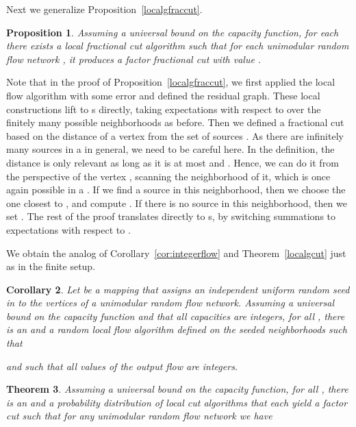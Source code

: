 \documentclass[12pt,a4paper]{article}
\newtheorem{Theorem}{Theorem}
\newtheorem{Corollary}[Theorem]{Corollary}
\newtheorem{Proposition}[Theorem]{Proposition}
\renewcommand{\:}{\colon}
\begin{document}
Next we generalize Proposition~\ref{localgfraccut}. 

\begin{Proposition}\label{localgfraccutuni}
Assuming a universal bound  on the capacity function, for each  there exists a local fractional cut algorithm such that for each unimodular random flow network , it produces a factor fractional cut with value .
\end{Proposition}

Note that in the proof of Proposition~\ref{localgfraccut}, we first applied the local flow algorithm with some error  and defined the residual graph. 
These local constructions lift to s directly, taking expectations with respect to  over the finitely many possible neighborhoods as before. 
Then we defined a fractional cut based on the distance of a vertex from the set of sources . 
As there are infinitely many sources in a  in general, we need to be careful here. 
In the definition, the distance is only relevant as long as it is at most  and . 
Hence, we can do it from the perspective of the vertex , scanning the  neighborhood of it, which is once again possible in a . 
If we find a source in this neighborhood, then we choose the one closest to , and compute . 
If there is no source in this neighborhood, then we set . 
The rest of the proof translates directly to s, by switching summations to expectations with respect to . 

We obtain the analog of Corollary~\ref{cor:integerflow} and Theorem~\ref{localgcut} just as in the finite setup. 

\begin{Corollary}\label{cor:integerflowURN}
Let  be a mapping that assigns an independent uniform random seed in  to the vertices of a unimodular random flow network. 
Assuming a universal bound  on the capacity function and that all capacities are integers, for all , there is an  and a random local flow algorithm  defined on the seeded neighborhoods such that 

and such that all values of the output flow are integers. 
\end{Corollary}

\begin{Theorem}\label{localgcutuni}
Assuming a universal bound  on the capacity function, for all , there is an  and a probability distribution  of local cut algorithms  that each yield a factor cut such that for any unimodular random flow network  we have

\end{Theorem}
\end{document}
